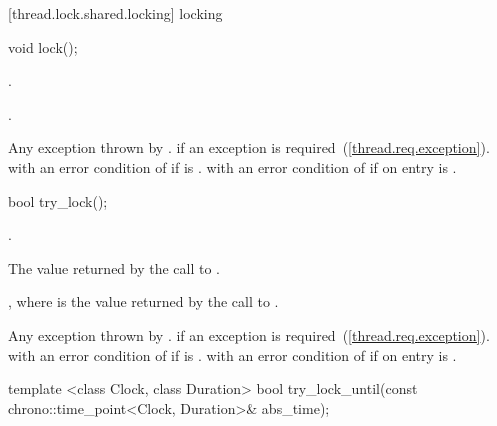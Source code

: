 [thread.lock.shared.locking]{ locking}

%
%
\begin{itemdecl}
void lock();
\end{itemdecl}

\begin{itemdescr}
\pnum
\effects {}.

\pnum
\postconditions {}.

\pnum
\throws Any exception thrown by .
 if an exception is required~(\ref{thread.req.exception}).
 with an error condition of
 if  is .
 with an error condition of
 if on entry  is .
\end{itemdescr}

%
%
\begin{itemdecl}
bool try_lock();
\end{itemdecl}

\begin{itemdescr}
\pnum
\effects {}.

\pnum
\returns The value returned by the call to .

\pnum
\postconditions {}, where  is the value returned by
the call to .

\pnum
\throws Any exception thrown by .
 if an exception is required~(\ref{thread.req.exception}).
 with an error condition of
 if  is .
 with an error condition of
 if on entry  is .

\end{itemdescr}

%
%
\begin{itemdecl}
template <class Clock, class Duration>
  bool
  try_lock_until(const chrono::time_point<Clock, Duration>& abs_time);
\end{itemdecl}

